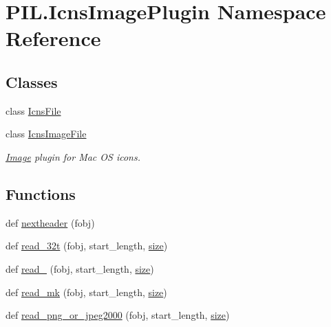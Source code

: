 \hypertarget{namespacePIL_1_1IcnsImagePlugin}{}\section{P\+I\+L.\+Icns\+Image\+Plugin Namespace Reference}
\label{namespacePIL_1_1IcnsImagePlugin}
\subsection*{Classes}
\begin{DoxyCompactItemize}
\item 
class \hyperlink{classPIL_1_1IcnsImagePlugin_1_1IcnsFile}{Icns\+File}
\item 
class \hyperlink{classPIL_1_1IcnsImagePlugin_1_1IcnsImageFile}{Icns\+Image\+File}
\begin{DoxyCompactList}\small\item\em \hyperlink{namespacePIL_1_1Image}{Image} plugin for Mac OS icons. \end{DoxyCompactList}\end{DoxyCompactItemize}
\subsection*{Functions}
\begin{DoxyCompactItemize}
\item 
def \hyperlink{namespacePIL_1_1IcnsImagePlugin_a5f63f526d534967e2f23c0f30ed7ecde}{nextheader} (fobj)
\item 
def \hyperlink{namespacePIL_1_1IcnsImagePlugin_a8462047123cc179b55adfaf1076a9f7d}{read\+\_\+32t} (fobj, start\+\_\+length, \hyperlink{namespacePIL_1_1IcnsImagePlugin_af38cbea1c9c068b8c6603f57be6b4040}{size})
\item 
def \hyperlink{namespacePIL_1_1IcnsImagePlugin_a75c273b82b925f03223d6cf4c01fcf86}{read\+\_} (fobj, start\+\_\+length, \hyperlink{namespacePIL_1_1IcnsImagePlugin_af38cbea1c9c068b8c6603f57be6b4040}{size})
\item 
def \hyperlink{namespacePIL_1_1IcnsImagePlugin_a91aa5887d40919eaf43cdc20e6e9aae1}{read\+\_\+mk} (fobj, start\+\_\+length, \hyperlink{namespacePIL_1_1IcnsImagePlugin_af38cbea1c9c068b8c6603f57be6b4040}{size})
\item 
def \hyperlink{namespacePIL_1_1IcnsImagePlugin_aee2cb47800de7c429c0ca72994dd6967}{read\+\_\+png\+\_\+or\+\_\+jpeg2000} (fobj, start\+\_\+length, \hyperlink{namespacePIL_1_1IcnsImagePlugin_af38cbea1c9c068b8c6603f57be6b4040}{size})
\end{DoxyCompactItemize}
